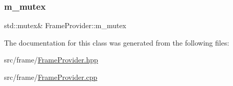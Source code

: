 \subsubsection{\texorpdfstring{m\+\_\+mutex}{m\_mutex}}
{\footnotesize\ttfamily std\+::mutex\& Frame\+Provider\+::m\+\_\+mutex\hspace{0.3cm}{\ttfamily [private]}}



The documentation for this class was generated from the following files\+:\begin{DoxyCompactItemize}
\item 
src/frame/\hyperlink{FrameProvider_8hpp}{Frame\+Provider.\+hpp}\item 
src/frame/\hyperlink{FrameProvider_8cpp}{Frame\+Provider.\+cpp}\end{DoxyCompactItemize}
